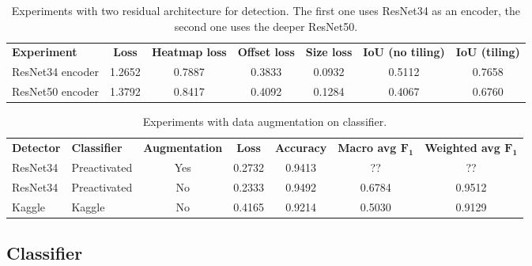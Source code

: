 \begin{table*}
	\begin{tabular}{lcccccc}
		\rowcolor[HTML]{EFEFEF} 
		\textbf{Experiment}   & \textbf{Loss} & \textbf{Heatmap loss} & \textbf{Offset loss} & \textbf{Size loss} & \textbf{IoU (no tiling)} & \textbf{IoU (tiling)} \\
		ResNet34 encoder      & 1.2652        & 0.7887                & 0.3833               & 0.0932             & 0.5112                   & 0.7658                \\
		ResNet50 encoder      & 1.3792        & 0.8417                & 0.4092               & 0.1284             & 0.4067                   & 0.6760
	\end{tabular}
	\caption{Experiments with two residual architecture for detection. The first one uses ResNet34 as an encoder, the second one uses the deeper ResNet50.}
	\label{tab:expdetector}
\end{table*}

\begin{table*}
	\begin{tabular}{llccccc}
		\rowcolor[HTML]{EFEFEF} 
		\textbf{Detector} & \textbf{Classifier} & \textbf{Augmentation} & \textbf{Loss} & \textbf{Accuracy} & \textbf{Macro avg $\mathbf{F_1}$} & \textbf{Weighted avg $\mathbf{F_1}$} \\
		ResNet34          & Preactivated        & Yes                   & 0.2732        & 0.9413  & ?? & ??     \\
		ResNet34          & Preactivated        & No                    & 0.2333        &  0.9492 & 0.6784    & 0.9512           \\
		Kaggle          & Kaggle    & No                   & 0.4165           & 0.9214     & 0.5030 & 0.9129         
	\end{tabular}
	\caption{Experiments with data augmentation on classifier.}
	\label{tab:classres}
\end{table*}

\subsection{Classifier}
\label{ssec:classifierexp}

